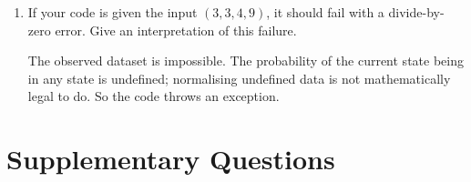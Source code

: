 \documentclass[10pt,\jkfside,a4paper]{article}
\begin{document}
\begin{enumerate}
\begin{enumerate}[label=(\alph*)]
\item If your code is given the input $(3, 3, 4, 9)$, it should fail with a
divide-by-zero error. Give an interpretation of this failure.

The observed dataset is impossible. The probability of the current
state being in any state is undefined; normalising undefined data is not
mathematically legal to do. So the code throws an exception.

\end{enumerate}

\end{enumerate}

\section{Supplementary Questions}
\end{document}
